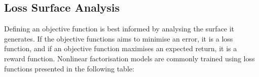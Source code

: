 \subsection{Loss Surface Analysis}
Defining an objective function is best informed by analysing the surface it generates. If the objective functions aims to minimise an error, it is a loss function, and if an objective function maximises an expected return, it is a reward function. Nonlinear factorisation models are commonly trained using loss functions presented in the following table:

